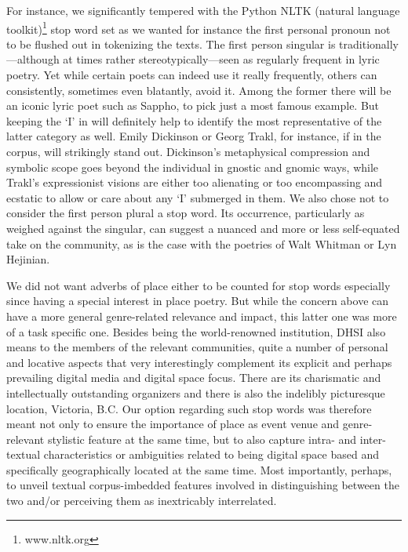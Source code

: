 For instance, we significantly tempered with the Python NLTK (natural
language toolkit)\footnote{{www.nltk.org}} stop word set as we wanted
for instance the first personal pronoun not to be flushed out in
tokenizing the texts. The first person singular is
traditionally---although at times rather stereotypically---seen as
regularly frequent in lyric poetry. Yet while certain poets can indeed
use it really frequently, others can consistently, sometimes even
blatantly, avoid it. Among the former there will be an iconic lyric poet
such as Sappho, to pick just a most famous example. But keeping the `I'
in will definitely help to identify the most representative of the
latter category as well. Emily Dickinson or Georg Trakl, for instance,
if in the corpus, will strikingly stand out. Dickinson's metaphysical
compression and symbolic scope goes beyond the individual in gnostic and
gnomic ways, while Trakl's expressionist visions are either too
alienating or too encompassing and ecstatic to allow or care about any
`I' submerged in them. We also chose not to consider the first person
plural a stop word. Its occurrence, particularly as weighed against the
singular, can suggest a nuanced and more or less self-equated take on
the community, as is the case with the poetries of Walt Whitman or Lyn
Hejinian.

We did not want adverbs of place either to be counted for stop words
especially since having a special interest in place poetry. But while
the concern above can have a more general genre-related relevance and
impact, this latter one was more of a task specific one. Besides being
the world-renowned institution, DHSI also means to the members of the
relevant communities, quite a number of personal and locative aspects
that very interestingly complement its explicit and perhaps prevailing
digital media and digital space focus. There are its charismatic and
intellectually outstanding organizers and there is also the indelibly
picturesque location, Victoria, B.C. Our option regarding such stop
words was therefore meant not only to ensure the importance of place as
event venue and genre-relevant stylistic feature at the same time, but
to also capture intra- and inter-textual characteristics or ambiguities
related to being digital space based and specifically geographically
located at the same time. Most importantly, perhaps, to unveil textual
corpus-imbedded features involved in distinguishing between the two
and/or perceiving them as inextricably interrelated.

